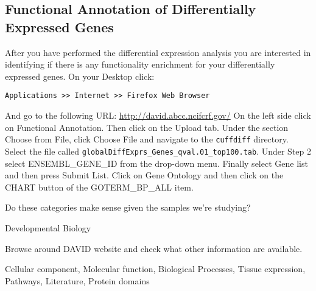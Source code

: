 \begin{bonus}
\section{Functional Annotation of Differentially Expressed Genes}
After you have performed the differential expression analysis you are interested
in identifying if there is any functionality enrichment for your differentially
expressed genes.
On your Desktop click:
\begin{lstlisting}
Applications >> Internet >> Firefox Web Browser
\end{lstlisting}
And go to the following URL: \url{http://david.abcc.ncifcrf.gov/}
On the left side click on Functional Annotation. Then click on the Upload tab.
Under the section Choose from File, click Choose File and navigate to the
\texttt{cuffdiff} directory. Select the file called \texttt{globalDiffExprs\_Genes\_qval.01\_top100.tab}.
Under Step 2 select ENSEMBL\_GENE\_ID from the drop-down menu. Finally select
Gene list and then press Submit List.
Click on Gene Ontology and then click on the CHART button of the GOTERM\_BP\_ALL item.

\begin{questions}
Do these categories make sense given the samples we're studying?
\begin{answer}
Developmental Biology
\end{answer}

Browse around DAVID website and check what other information are available.
\begin{answer}
Cellular component, Molecular function, Biological Processes, Tissue expression, Pathways, Literature, Protein domains 
\end{answer}
\end{questions}
\end{bonus}

\newpage

